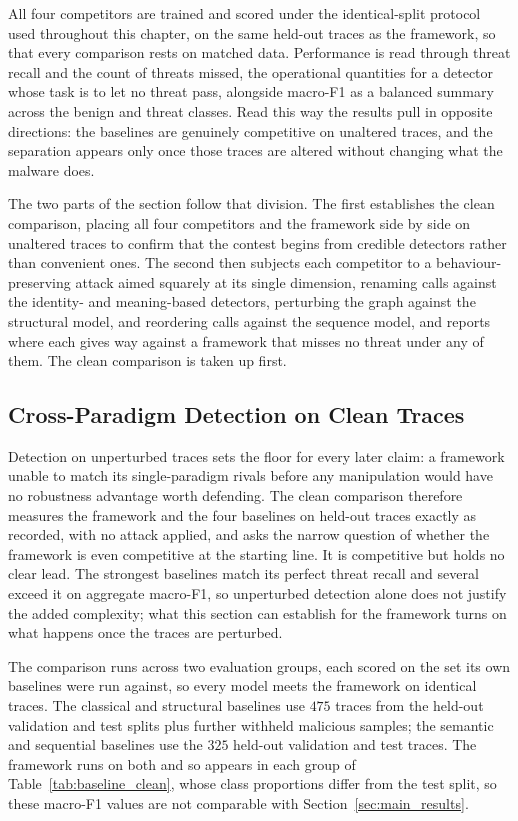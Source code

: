 \documentclass[%
    BCOR=10mm,
    DIV=13,
    toc=bibliography,
    toc=listof,
    oneside,
    12pt,
]{scrbook}
\begin{document}
All four competitors are trained and scored under the identical-split protocol
used throughout this chapter, on the same held-out traces as the framework, so
that every comparison rests on matched data. Performance is read through
threat recall and the count of threats missed, the operational quantities for
a detector whose task is to let no threat pass, alongside macro-F1 as a
balanced summary across the benign and threat classes. Read this way the
results pull in opposite directions: the baselines are genuinely competitive
on unaltered traces, and the separation appears only once those traces are
altered without changing what the malware does.

The two parts of the section follow that division. The first establishes the
clean comparison, placing all four competitors and the framework side by side on
unaltered traces to confirm that the contest begins from credible detectors
rather than convenient ones. The second then subjects each competitor to a
behaviour-preserving attack aimed squarely at its single dimension, renaming
calls against the identity- and meaning-based detectors, perturbing the graph
against the structural model, and reordering calls against the sequence model,
and reports where each gives way against a framework that misses no threat under
any of them. The clean comparison is taken up first.

\subsection{Cross-Paradigm Detection on Clean Traces}
\label{subsec:cross_paradigm}

Detection on unperturbed traces sets the floor for every later claim: a
framework unable to match its single-paradigm rivals before any manipulation
would have no robustness advantage worth defending. The clean comparison
therefore measures the framework and the four baselines on held-out traces
exactly as recorded, with no attack applied, and asks the narrow question of
whether the framework is even competitive at the starting line. It is
competitive but holds no clear lead. The strongest baselines match its perfect
threat recall and several exceed it on aggregate macro-F1, so unperturbed
detection alone does not justify the added complexity; what this section can
establish for the framework turns on what happens once the traces are
perturbed.

The comparison runs across two evaluation groups, each scored on the set its own
baselines were run against, so every model meets the framework on identical
traces. The classical and structural baselines use $475$ traces from the held-out
validation and test splits plus further withheld malicious samples; the semantic
and sequential baselines use the $325$ held-out validation and test traces. The
framework runs on both and so appears in each group of
Table~\ref{tab:baseline_clean}, whose class proportions differ from the test
split, so these macro-F1 values are not comparable with
Section~\ref{sec:main_results}.
\end{document}
